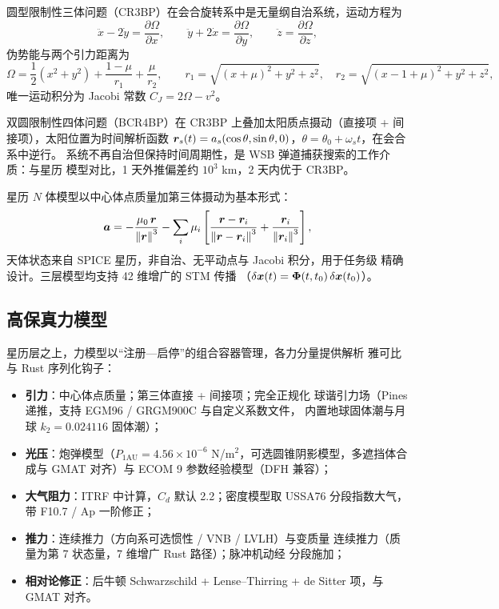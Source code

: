 圆型限制性三体问题（CR3BP）在会合旋转系中是无量纲自治系统，运动方程为
\begin{equation}
  \ddot{x} - 2\dot{y} = \frac{\partial\Omega}{\partial x}, \qquad
  \ddot{y} + 2\dot{x} = \frac{\partial\Omega}{\partial y}, \qquad
  \ddot{z} = \frac{\partial\Omega}{\partial z},
\end{equation}
伪势能与两个引力距离为
\begin{equation}
  \Omega = \frac{1}{2}(x^2 + y^2) + \frac{1-\mu}{r_1} + \frac{\mu}{r_2}, \qquad
  r_1 = \sqrt{(x+\mu)^2 + y^2 + z^2}, \quad
  r_2 = \sqrt{(x-1+\mu)^2 + y^2 + z^2},
\end{equation}
唯一运动积分为 Jacobi 常数 $C_J = 2\Omega - v^2$。

双圆限制性四体问题（BCR4BP）在 CR3BP 上叠加太阳质点摄动（直接项 +
间接项），太阳位置为时间解析函数 $\bm{r}_s(t) = a_s(\cos\theta,
\sin\theta, 0)$，$\theta = \theta_0 + \omega_s t$，在会合系中逆行。
系统不再自治但保持时间周期性，是 WSB 弹道捕获搜索的工作介质：与星历
模型对比，1 天外推偏差约 $10^3$ km，2 天内优于 CR3BP。

星历 $N$ 体模型以中心体点质量加第三体摄动为基本形式：
\begin{equation}
  \bm{a} = -\frac{\mu_0\,\bm{r}}{\left\lVert \bm{r} \right\rVert^3}
  - \sum_i \mu_i \left[
    \frac{\bm{r} - \bm{r}_i}{\left\lVert \bm{r} - \bm{r}_i \right\rVert^3}
    + \frac{\bm{r}_i}{\left\lVert \bm{r}_i \right\rVert^3}
  \right],
\end{equation}
天体状态来自 SPICE 星历，非自治、无平动点与 Jacobi 积分，用于任务级
精确设计。三层模型均支持 42 维增广的 STM 传播
（$\delta\bm{x}(t) = \bm{\Phi}(t, t_0)\,\delta\bm{x}(t_0)$）。

\subsection{高保真力模型}

星历层之上，力模型以“注册—启停”的组合容器管理，各力分量提供解析
雅可比与 Rust 序列化钩子：

\begin{itemize}
  \item \textbf{引力}：中心体点质量；第三体直接 + 间接项；完全正规化
        球谐引力场（Pines 递推，支持 EGM96 / GRGM900C 与自定义系数文件，
        内置地球固体潮与月球 $k_2 = 0.024116$ 固体潮）；
  \item \textbf{光压}：炮弹模型（$P_{1\mathrm{AU}} = 4.56\times10^{-6}$
        N/m$^2$，可选圆锥阴影模型，多遮挡体合成与 GMAT 对齐）与
        ECOM 9 参数经验模型（DFH 兼容）；
  \item \textbf{大气阻力}：ITRF 中计算，$C_d$ 默认 2.2；密度模型取
        USSA76 分段指数大气，带 F10.7 / Ap 一阶修正；
  \item \textbf{推力}：连续推力（方向系可选惯性 / VNB / LVLH）与变质量
        连续推力（质量为第 7 状态量，7 维增广 Rust 路径）；脉冲机动经
        分段施加；
  \item \textbf{相对论修正}：后牛顿 Schwarzschild + Lense--Thirring +
        de Sitter 项，与 GMAT 对齐。
\end{itemize}

